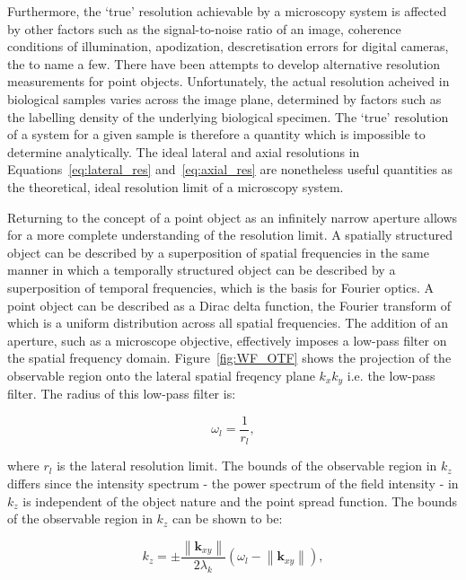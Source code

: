 Furthermore, the `true' resolution achievable by a microscopy system is affected 
by other factors such as the signal-to-noise ratio of an image, coherence 
conditions of illumination, apodization, descretisation errors for digital 
cameras, the to name a few\cite{den1997resolution}. There have been attempts to 
develop alternative resolution measurements for point objects\cite{ram2006beyond}. 
Unfortunately, the actual resolution acheived in biological samples varies 
across the image plane, determined by factors such as the labelling density of 
the underlying biological specimen\cite{culley2017nanoj}. The `true' resolution 
of a system for a given sample is therefore a quantity which is impossible to 
determine analytically. The ideal lateral and axial resolutions in 
Equations~\ref{eq:lateral_res} and~\ref{eq:axial_res} are nonetheless useful
quantities as the theoretical, ideal resolution limit of a microscopy system.

Returning to the concept of a point object as an infinitely narrow aperture allows 
for a more complete understanding of the resolution limit. A spatially structured 
object can be described by a superposition of spatial frequencies in the same 
manner in which a temporally structured object can be described by a superposition 
of temporal frequencies, which is the basis for Fourier 
optics\cite{goodman2005introduction}. A point object can be described as a Dirac
delta function, the Fourier transform of which is a uniform distribution across all
spatial frequencies. The addition of an aperture, such as a microscope objective, 
effectively imposes a low-pass filter on the spatial frequency domain. 
Figure~\ref{fig:WF_OTF} shows the projection of the observable region onto the 
lateral spatial freqency plane $k_{x}k_{y}$ i.e. the low-pass filter. The radius of
this low-pass filter is: 

\begin{equation}\label{eq:lateral_spatial_freq_res}
	\omega_{l} = \frac{1}{r_{l}},
\end{equation}

where $r_{l}$ is the lateral resolution limit. The bounds of the observable region 
in $k_{z}$ differs since the intensity spectrum - the power spectrum of the 
field intensity - in $k_{z}$ is independent of the object nature and the point
spread function\cite{frieden1967optical}. The bounds of the observable region in
$k_{z}$ can be shown to be:

\begin{equation}\label{eq:observable_region_kz}
k_{z} = \pm\frac{\left\|\textbf{k}_{xy}\right\|}{2\lambda_{k}}(\omega_{l} - \left\|\textbf{k}_{xy}\right\|),
\end{equation}

